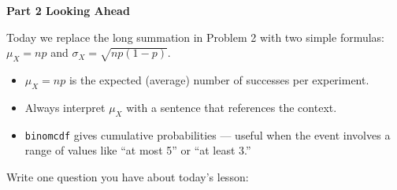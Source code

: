\documentclass[10pt]{article}
\begin{document}
\vspace{0.08in}

{\large\bfseries\color{navy} Part 2 \quad Looking Ahead}

\vspace{0.08in}

\noindent Today we replace the long summation in Problem 2 with two simple formulas:
$\mu_X = np$ and $\sigma_X = \sqrt{np(1-p)}$.

\vspace{0.1in}

\begin{tcolorbox}[colback=greenbg, colframe=greenacc, boxrule=0.8pt, arc=2mm,
    left=4mm, right=4mm, top=3mm, bottom=3mm]
    \small
    \begin{itemize}[leftmargin=1.3em, itemsep=4pt]
  \item $\mu_X = np$ is the expected (average) number of successes per experiment.
  \item Always interpret $\mu_X$ with a sentence that references the context.
  \item \texttt{binomcdf} gives cumulative probabilities --- useful when the event
        involves a range of values like ``at most 5'' or ``at least 3.''
    \end{itemize}
\end{tcolorbox}

\vspace{0.1in}

\noindent\textcolor{slate}{\small Write one question you have about today's lesson:}\\[4pt]
\writeline\\[2pt]\writeline
\end{document}
